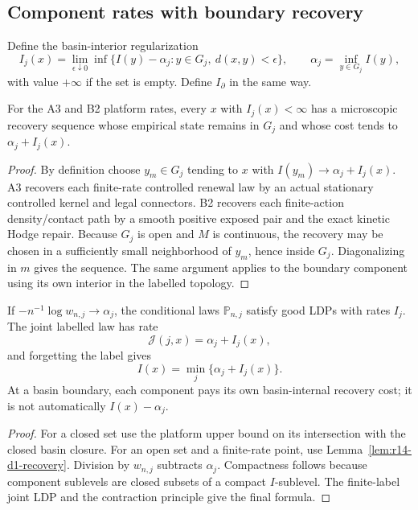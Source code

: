 \subsection{Component rates with boundary recovery}

Define the basin-interior regularization
\[
 I_j(x)=
 \lim_{\epsilon\downarrow0}
 \inf\{I(y)-\alpha_j:
       y\in G_j,\ d(x,y)<\epsilon\},
 \qquad
 \alpha_j=\inf_{y\in G_j}I(y),
\]
with value \(+\infty\) if the set is empty.  Define \(I_\partial\) in the same
way.

\begin{lemma}
\label{lem:r14-d1-recovery}
For the A3 and B2 platform rates, every \(x\) with \(I_j(x)<\infty\) has a
microscopic recovery sequence whose empirical state remains in \(G_j\) and
whose cost tends to \(\alpha_j+I_j(x)\).
\end{lemma}

\begin{proof}
By definition choose \(y_m\in G_j\) tending to \(x\) with
\(I(y_m)\to\alpha_j+I_j(x)\).  A3 recovers each finite-rate controlled renewal
law by an actual stationary controlled kernel and legal connectors.  B2
recovers each finite-action density/contact path by a smooth positive exposed
pair and the exact kinetic Hodge repair.  Because \(G_j\) is open and
\(M\) is continuous, the recovery may be chosen in a sufficiently small
neighborhood of \(y_m\), hence inside \(G_j\).  Diagonalizing in \(m\) gives
the sequence.  The same argument applies to the boundary component using its
own interior in the labelled topology.
\end{proof}

\begin{theorem}
\label{thm:r14-d1-component}
If \(-n^{-1}\log w_{n,j}\to\alpha_j\), the conditional laws
\(\mathbb P_{n,j}\) satisfy good LDPs with rates \(I_j\).  The joint labelled
law has rate
\[
 \mathcal J(j,x)=\alpha_j+I_j(x),
\]
and forgetting the label gives
\[
 I(x)=\min_j\{\alpha_j+I_j(x)\}.
\]
At a basin boundary, each component pays its own basin-internal recovery
cost; it is not automatically \(I(x)-\alpha_j\).
\end{theorem}

\begin{proof}
For a closed set use the platform upper bound on its intersection with the
closed basin closure.  For an open set and a finite-rate point, use
Lemma~\ref{lem:r14-d1-recovery}.  Division by \(w_{n,j}\) subtracts
\(\alpha_j\).  Compactness follows because component sublevels are closed
subsets of a compact \(I\)-sublevel.  The finite-label joint LDP and the
contraction principle give the final formula.
\end{proof}


